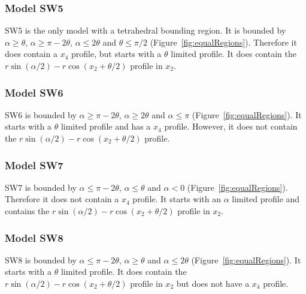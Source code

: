 

\subsubsection{Model SW5} \label{SW5}

SW5 is the only model with a tetrahedral bounding region.
It is bounded by $\alpha \ge \theta$, $\alpha \ge \pi - 2\theta$, $\alpha \le 2\theta$ and $\theta \le \pi/2$ (Figure~\ref{fig:equalRegions}).
Therefore it does contain a $x_4$ profile, but starts with a $\theta$ limited profile.
It does contain the $r\sin(\alpha/2) - r\cos(x_2 + \theta/2)$ profile in $x_2$.



\subsubsection{Model SW6} \label{SW6}

SW6 is bounded by $\alpha \ge \pi - 2\theta$,  $\alpha \ge 2\theta$ and $\alpha \le \pi$ (Figure~\ref{fig:equalRegions}).
It starts with a $\theta$ limited profile and has a $x_4$ profile.
However, it does not contain the $r\sin(\alpha/2) - r\cos(x_2 + \theta/2)$ profile.




\subsubsection{Model SW7} \label{SW7}

SW7 is bounded by $\alpha \le \pi - 2\theta$, $\alpha \le \theta$ and $\alpha < 0$ (Figure~\ref{fig:equalRegions}).
Therefore it does not contain a $x_4$ profile.
It starts with an $\alpha$ limited profile and contains the $r\sin(\alpha/2) - r\cos(x_2 + \theta/2)$ profile in $x_2$.




\subsubsection{Model SW8} \label{SW8}

SW8 is bounded by $\alpha \le \pi - 2\theta$, $\alpha \ge \theta$ and $\alpha \le 2\theta$ (Figure~\ref{fig:equalRegions}).
It starts with a $\theta$ limited profile.
It does contain the $r\sin(\alpha/2) - r\cos(x_2 + \theta/2)$ profile in $x_2$ but does not have a $x_4$ profile.

